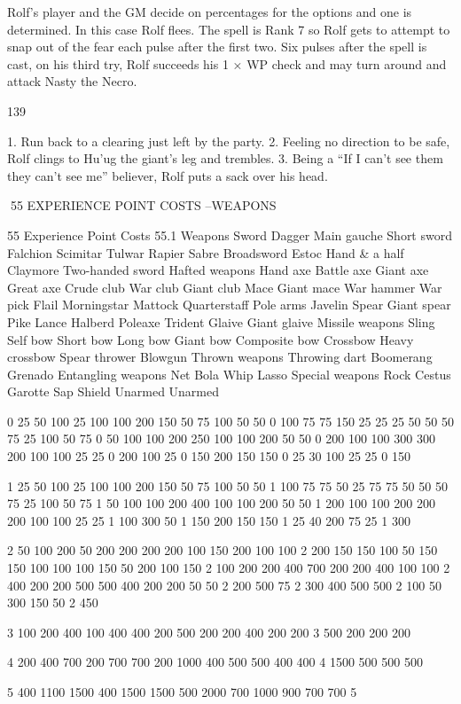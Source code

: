 \documentclass[a4paper]{article}
\begin{document}
\begin{multicols}{3}
Rolf’s player and the GM decide on percentages for the
options and one is determined. In this case Rolf flees. The
spell is Rank 7 so Rolf gets to attempt to snap out of the
fear each pulse after the first two. Six pulses after the spell
is cast, on his third try, Rolf succeeds his 1 × WP check
and may turn around and attack Nasty the Necro.

139

1. Run back to a clearing just left by the party.
2. Feeling no direction to be safe, Rolf clings to Hu’ug the
giant’s leg and trembles.
3. Being a “If I can’t see them they can’t see me” believer,
Rolf puts a sack over his head.

55 EXPERIENCE POINT COSTS –WEAPONS

55 Experience Point Costs
55.1 Weapons
Sword
Dagger
Main gauche
Short sword
Falchion
Scimitar
Tulwar
Rapier
Sabre
Broadsword
Estoc
Hand & a half
Claymore
Two-handed sword
Hafted weapons
Hand axe
Battle axe
Giant axe
Great axe
Crude club
War club
Giant club
Mace
Giant mace
War hammer
War pick
Flail
Morningstar
Mattock
Quarterstaff
Pole arms
Javelin
Spear
Giant spear
Pike
Lance
Halberd
Poleaxe
Trident
Glaive
Giant glaive
Missile weapons
Sling
Self bow
Short bow
Long bow
Giant bow
Composite bow
Crossbow
Heavy crossbow
Spear thrower
Blowgun
Thrown weapons
Throwing dart
Boomerang
Grenado
Entangling weapons
Net
Bola
Whip
Lasso
Special weapons
Rock
Cestus
Garotte
Sap
Shield
Unarmed
Unarmed

0
25
50
100
25
100
100
200
150
50
75
100
50
50
0
100
75
75
150
25
25
25
50
50
50
75
25
100
50
75
0
50
100
100
200
250
100
100
200
50
50
0
200
100
100
300
300
200
100
100
25
25
0
200
100
25
0
150
200
150
150
0
25
30
100
25
25
0
150

1
25
50
100
25
100
100
200
150
50
75
100
50
50
1
100
75
75
50
25
75
75
50
50
50
75
25
100
50
75
1
50
100
100
200
400
100
100
200
50
50
1
200
100
100
200
200
200
100
100
25
25
1
100
300
50
1
150
200
150
150
1
25
40
200
75
25
1
300

2
50
100
200
50
200
200
200
200
100
150
200
100
100
2
200
150
150
100
50
150
150
100
100
100
150
50
200
100
150
2
100
200
200
400
700
200
200
400
100
100
2
400
200
200
500
500
400
200
200
50
50
2
200
500
75
2
300
400
500
500
2
100
50
300
150
50
2
450

3
100
200
400
100
400
400
200
500
200
200
400
200
200
3
500
200
200
200

4
200
400
700
200
700
700
200
1000
400
500
500
400
400
4
1500
500
500
500

5
400
1100
1500
400
1500
1500
500
2000
700
1000
900
700
700
5


\end{multicols}
\end{document}
